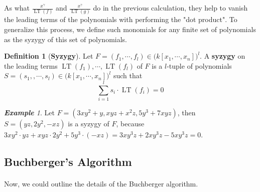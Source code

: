 \documentclass{article}
\newtheorem{lemma}[theorem]{Lemma}
\newcommand{\lt}{\ensuremath{\operatorname{LT}}}
\theoremstyle{definition}
\newtheorem{definition}{Definition}[section]
\theoremstyle{remark}
\theoremstyle{example}
\newtheorem{example}{\textbf{Example}}[section]
\begin{document}
As what $\tfrac{x^{\gamma}}{\lt(f)}$ and $\tfrac{x^{\gamma}}{\lt(g)}$ do in the previous calculation, they help to vanish the leading terms of the polynomials with performing the "dot product". To generalize this process, we define such monomials for any finite set of polynomials as the syzygy of this set of polynomials.

\begin{definition}[\textbf{Syzygy}]
    Let $F = (f_1, \cdots, f_l) \in {(k[x_1,\cdots,x_n]})^l$. A \textbf{syzygy} on the leading terms $\lt(f_1), \cdots, \lt(f_l)$ of $F$ is a $l$-tuple of polynomials $S = (s_1,,\cdots, s_l) \in {(k[x_1,\cdots,x_n]})^l$ such that
    \begin{equation}
        \sum_{i = 1}^{l} s_i \cdot \lt(f_i) = 0
    \end{equation}
\end{definition}

\begin{example}
    Let $F = (3xy^2 + y, xyz+x^2z, 5y^3+7xyz)$, then $S = (yz,2y^2,-xz)$ is a syzygy of $F$, because $3xy^2\cdot yz +xyz \cdot 2y^2 + 5y^3\cdot(-xz) = 3xy^3z + 2xy^3z - 5xy^3z = 0$.
\end{example}



\subsection{Buchberger's Algorithm}

\paragraph{}

Now, we could outline the details of the Buchberger algorithm.
\end{document}
